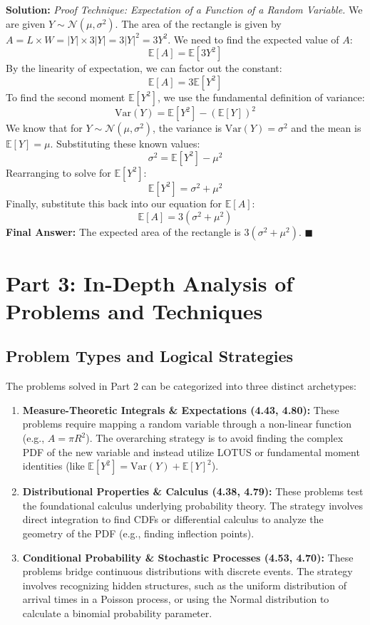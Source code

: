 \documentclass[11pt, a4paper]{article}
\theoremstyle{definition}
\theoremstyle{remark}
\newcommand{\E}{\mathbb{E}}
\begin{document}
\textbf{Solution:}
\textit{Proof Technique: Expectation of a Function of a Random Variable.}
We are given $Y \sim \mathcal{N}(\mu, \sigma^2)$.
The area of the rectangle is given by $A = L \times W = |Y| \times 3|Y| = 3|Y|^2 = 3Y^2$.
We need to find the expected value of $A$:
\[ \E[A] = \E[3Y^2] \]
By the linearity of expectation, we can factor out the constant:
\[ \E[A] = 3\E[Y^2] \]
To find the second moment $\E[Y^2]$, we use the fundamental definition of variance:
\[ \text{Var}(Y) = \E[Y^2] - (\E[Y])^2 \]
We know that for $Y \sim \mathcal{N}(\mu, \sigma^2)$, the variance is $\text{Var}(Y) = \sigma^2$ and the mean is $\E[Y] = \mu$. Substituting these known values:
\[ \sigma^2 = \E[Y^2] - \mu^2 \]
Rearranging to solve for $\E[Y^2]$:
\[ \E[Y^2] = \sigma^2 + \mu^2 \]
Finally, substitute this back into our equation for $\E[A]$:
\[ \E[A] = 3(\sigma^2 + \mu^2) \]
\textbf{Final Answer:} The expected area of the rectangle is $3(\sigma^2 + \mu^2)$.
$\blacksquare$

\newpage
\section{Part 3: In-Depth Analysis of Problems and Techniques}

\subsection{Problem Types and Logical Strategies}
The problems solved in Part 2 can be categorized into three distinct archetypes:
\begin{enumerate}
    \item \textbf{Measure-Theoretic Integrals \& Expectations (4.43, 4.80):} These problems require mapping a random variable through a non-linear function (e.g., $A = \pi R^2$). The overarching strategy is to avoid finding the complex PDF of the new variable and instead utilize LOTUS or fundamental moment identities (like $\E[Y^2] = \text{Var}(Y) + \E[Y]^2$).
    \item \textbf{Distributional Properties \& Calculus (4.38, 4.79):} These problems test the foundational calculus underlying probability theory. The strategy involves direct integration to find CDFs or differential calculus to analyze the geometry of the PDF (e.g., finding inflection points).
    \item \textbf{Conditional Probability \& Stochastic Processes (4.53, 4.70):} These problems bridge continuous distributions with discrete events. The strategy involves recognizing hidden structures, such as the uniform distribution of arrival times in a Poisson process, or using the Normal distribution to calculate a binomial probability parameter.
\end{enumerate}
\end{document}
